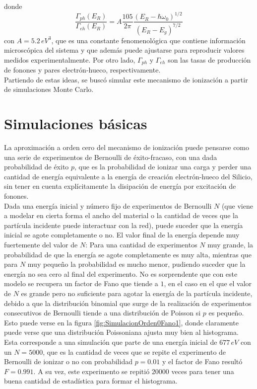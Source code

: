 donde 
\begin{equation*}
    \frac{\Gamma_{ph}(E_{R})}{\Gamma_{eh}(E_{R})}
    = A\frac{105}{2\pi}\frac{(E_{R} - \hbar \omega_{0})^{1/2}}{(E_{R} - E_{g})^{7/2}}
\end{equation*}
con $A = 5.2\,eV^{3}$, que es una constante fenomenológica que contiene información microscópica del sistema y que además puede ajustarse para reproducir valores medidos experimentalmente. Por otro lado, $\Gamma_{ph}$ y $\Gamma_{eh}$ son las tasas de producción de fonones y pares electrón-hueco, respectivamente.\\
\indent Partiendo de estas ideas, se buscó simular este mecanismo de ionización a partir de simulaciones Monte Carlo.
\section{Simulaciones básicas}
\noindent La aproximación a orden cero del mecanismo de ionización puede pensarse como una serie de experimentos de Bernoulli de éxito-fracaso, con una dada probabilidad de éxito $p$, que es la probabilidad de ionizar una carga y perder una cantidad de energía equivalente a la energía de creación electrón-hueco del Silicio, sin tener en cuenta explícitamente la disipación de energía por excitación de fonones.\\
\indent Dada una energía inicial y número fijo de experimentos de Bernoulli $N$ (que viene a modelar en cierta forma el ancho del material o la cantidad de veces que la partícula incidente puede interactuar con la red), puede suceder que la energía inicial se agote completamente o no. El valor final de la energía depende muy fuertemente del valor de $N$: Para una cantidad de experimentos $N$ muy grande, la probabilidad de que la energía se agote completamente es muy alta, mientras que para $N$ muy pequeño la probabilidad es mucho menor, pudiendo suceder que la energía no sea cero al final del experimento. No es sorprendente que con este modelo se recupera un factor de Fano que tiende a $1$, en el caso en el que el valor de $N$ es grande pero no suficiente para agotar la energía de la partícula incidente, debido a que la distribución binomial que surge de la realización de experimentos consecutivos de Bernoulli tiende a una distribución de Poisson si $p$ es pequeño. Esto puede verse en la figura \ref{fig:SimulacionOrden0Fano1}, donde claramente puede verse que una distribución Poissoniana ajusta muy bien al histograma. Esta corresponde a una simulación que parte de una energía inicial de $677\,\si{eV}$ con un $N = 5000$, que es la cantidad de veces que se repite el experimento de Bernoulli de ionizar o no con probabilidad $p=0.01$ y el factor de Fano resultó $F = 0.991$. A su vez, este experimento se repitió $20000$ veces para tener una buena cantidad de estadística para formar el histograma.\\

